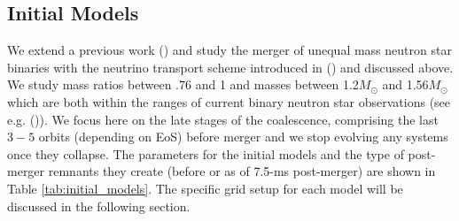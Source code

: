 







\subsection{Initial Models}
\label{sec:initial_models}
We extend a previous work (\citet*{foucart:2015gaa}) and study the merger
of unequal mass neutron star binaries with the neutrino transport scheme introduced in (\citet*{foucart2016impact}) and discussed above. We study mass ratios between .76 and 1 and masses between 1.2$M_\odot$ and 1.56$M_\odot$ which are both within the ranges of current binary neutron star observations (see e.g. (\citet*{lattimer:2012nd})). We focus here on the late stages of the coalescence, comprising the last $3-5$ orbits (depending on EoS) before merger and we stop evolving any systems once they collapse. The parameters for the initial models and the type of post-merger remnants they create (before or as of 7.5-ms post-merger) are shown in Table \ref{tab:initial_models}. The specific grid setup for each model will be discussed in the following section.

